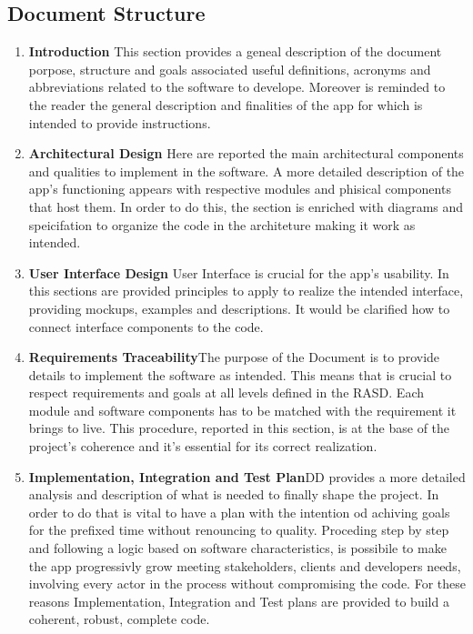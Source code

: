 \subsection{Document Structure}
\begin{enumerate}
    \item \textbf{Introduction} This section provides a geneal description of the document porpose, structure and goals associated useful definitions, acronyms and abbreviations related to the software to develope. Moreover is reminded to the reader the general description and finalities of the app for which is intended to provide instructions.
    \item \textbf{Architectural Design} Here are reported the main architectural components and qualities to implement in the software. A more detailed description of the app's functioning appears with respective modules and phisical components that host them. In order to do this, the section is enriched with diagrams and speicifation to organize the code in the architeture making it work as intended.
    \item \textbf{User Interface Design} User Interface is crucial for the app's usability. In this sections are provided principles to apply to realize the intended interface, providing mockups, examples and descriptions. It would be clarified how to connect interface components to the code.
    \item \textbf{Requirements Traceability}The purpose of the Document is to provide details to implement the software as intended. This means that is crucial to respect requirements and goals at all levels defined in the RASD. Each module and software components has to be matched with the requirement it brings to live. This procedure, reported in this section, is at the base of the project's coherence and it's essential for its  correct realization.
    \item \textbf{Implementation, Integration and Test Plan}DD provides a more detailed analysis and description of what is needed to finally shape the project. In order to do that is vital to have a plan with the intention od achiving goals for the prefixed time without renouncing to quality. Proceding step by step and following a logic based on software characteristics, is possibile to make the app progressivly grow meeting stakeholders, clients and developers needs, involving every actor in the process without compromising the code. For these reasons Implementation, Integration and Test plans are provided to build a coherent, robust, complete code.
\end{enumerate}
